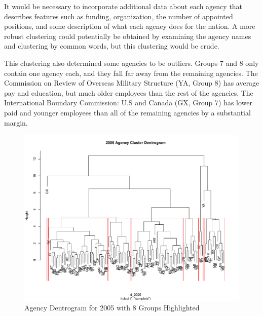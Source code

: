 \documentclass{article}
\begin{document}
    It would be necessary to incorporate additional data about each agency that describes features such as funding, organization, the number of appointed positions, and some description of what each agency does for the nation. A more robust clustering could potentially be obtained by examining the agency names and clustering by common words, but this clustering would be crude.
    \par
    This clustering also determined some agencies to be outliers. Groups 7 and 8 only contain one agency each, and they fall far away from the remaining agencies. The Commission on Review of Overseas Military Structure (YA, Group 8) has average pay and education, but much older employees than the rest of the agencies. The International Boundary Commission: U.S and Canada (GX, Group 7) has lower paid and younger employees than all of the remaining agencies by a substantial margin.

    \begin{center}
        \begin{figure}
            \includegraphics[scale=0.4]{./images/2005-dentrogram.pdf}
            \caption{Agency Dentrogram for 2005 with 8 Groups Highlighted}
            \label{fig:4}
        \end{figure}
    \end{center}
\end{document}
